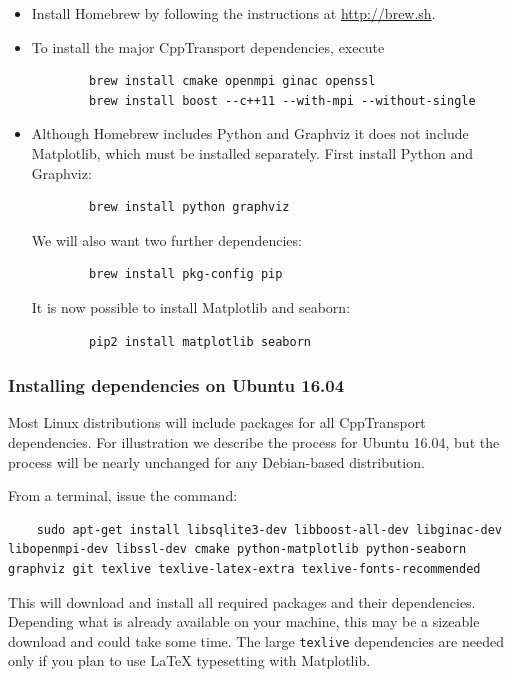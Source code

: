 \documentclass[11pt,a4paper]{article}
\newcommand{\packagefont}{\sffamily}
\newcommand{\CppTransport}{{\packagefont CppTransport}}
\newcommand{\Python}{{\packagefont Python}}
\newcommand{\Matplotlib}{{\packagefont Matplotlib}}
\newcommand{\seaborn}{{\packagefont seaborn}}
\newcommand{\Homebrew}{{\packagefont Homebrew}}
\newcommand{\Graphviz}{{\packagefont Graphviz}}
\begin{document}
\begin{itemize}
    \item Install {\Homebrew} by following the instructions at
    \url{http://brew.sh}.
    
    \item To install the major {\CppTransport} dependencies, execute
    \begin{verbatim}
        brew install cmake openmpi ginac openssl
        brew install boost --c++11 --with-mpi --without-single 
    \end{verbatim}

    \item Although {\Homebrew} includes {\Python} and {\Graphviz} it does not
    include {\Matplotlib}, which must be installed separately.
    First install {\Python} and {\Graphviz}:
    \begin{verbatim}
        brew install python graphviz    
    \end{verbatim}
    We will also want two further dependencies:
    \begin{verbatim}
        brew install pkg-config pip    
    \end{verbatim}
    It is now possible to install {\Matplotlib} and {\seaborn}:
    \begin{verbatim}
        pip2 install matplotlib seaborn    
    \end{verbatim}

\end{itemize}

\subsubsection{Installing dependencies on Ubuntu 16.04}
Most Linux distributions will include packages for all
{\CppTransport} dependencies. For illustration we describe the process for
Ubuntu 16.04, but the process will be nearly unchanged for any
Debian-based distribution.

From a terminal, issue the command:
\begin{verbatim}
    sudo apt-get install libsqlite3-dev libboost-all-dev libginac-dev libopenmpi-dev libssl-dev cmake python-matplotlib python-seaborn graphviz git texlive texlive-latex-extra texlive-fonts-recommended
\end{verbatim}
This will download and install all required packages and their dependencies.
Depending what is already available on your machine, this may be a sizeable
download and could take some time.
The large \texttt{texlive} dependencies are needed only if you plan to
use {\LaTeX} typesetting with {\Matplotlib}.
\end{document}
